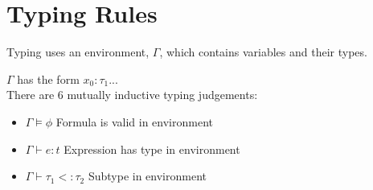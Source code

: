 \documentclass[12pt,a4paper,titlepage]{article}
\newcommand{\ts}{\vdash}
\newcommand{\dts}{\vDash}
\begin{document}
    \section{Typing Rules}
    Typing uses an environment, $\Gamma$, which contains variables and their types.

    $\Gamma$ has the form $x_0:\tau_1...$\\

    There are 6 mutually inductive typing judgements:
    \begin{itemize}
        \item $\Gamma \dts \phi$ Formula is valid in environment
        \item $\Gamma \ts e : t$ Expression has type in environment
        \item $\Gamma \ts \tau_1 <: \tau_2$ Subtype in environment
    \end{itemize}
\end{document}
